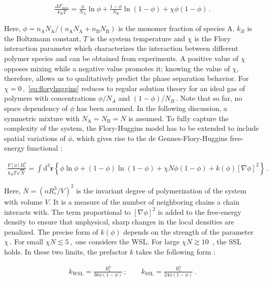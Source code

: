 \documentclass[bachelor,       %
               twoside,        %
               BCOR10mm,       %
               ngerman, english %
               ]{GAUBM}
\begin{document}
\begin{align}
  \frac{\Delta F_{mix}}{k_BT}=\frac{\phi}{N_\mathrm A}\ln\phi+\frac{1-\phi}{N_\mathrm B}\ln(1-\phi)+\chi\phi(1-\phi)\,.
  \label{eq:floryhuggins}
\end{align}

Here, $\phi=n_\mathrm AN_\mathrm A/(n_\mathrm AN_\mathrm A+n_\mathrm BN_\mathrm B)$ is the monomer fraction of species A, $k_B$ is the Boltzmann constant, $T$ is the system temperature and $\chi$ is the Flory interaction parameter which characterizes the interaction between different polymer species and can be obtained from experiments. A positive value of $\chi$ opposes mixing while a negative value promotes it; knowing the value of $\chi$, therefore, allows us to qualitatively predict the phase separation behavior. For $\chi=0\,,$ \eqref{eq:floryhuggins} reduces to regular solution theory for an ideal gas of polymers with concentrations $\phi/N_A$ and $(1-\phi)/N_B\,.$  Note that so far, no space dependency of $\phi$ has been assumed. In the following discussion, a symmetric mixture with $N_\mathrm A=N_\mathrm B=N$ is assumed. To fully capture the complexity of the system, the Flory-Huggins model has to be extended to include spatial variations of $\phi$, which gives rise to the de Gennes-Flory-Huggins free-energy functional  \cite{deGennes80, Reister02}:


\begin{align}
  \frac{F[\phi]R_e^3}{k_BT\sqrt{\bar N}}=\int \mathrm{d}^3\mathbf{r}\left\{\phi\ln\phi+(1-\phi)\ln(1-\phi)+\chi N\phi(1-\phi)+k(\phi)[\nabla\phi]^2\right\}\,.
  \label{eq:flory_fctl}
\end{align}

Here, $\bar N=\left(nR_e^3/V\right)^2$ is the invariant degree of polymerization of the system with volume $V$. It is a measure of the number of neighboring chains a chain interacts with. The term proportional to $[\nabla\phi]^2$ is added to the free-energy density to ensure that unphysical, sharp changes in the local densities are penalized. The precise form of $k(\phi)$ depends on the strength of the parameter $\chi\,$. For small $\chi N\lesssim 5\,,$ one considers the \ac{WSL}. For large $\chi N\gtrsim10\,$ \cite{Semenov1996Dec}, the \ac{SSL} holds. In these two limits, the prefactor $k$ takes the following form \cite{Reister02}:

\begin{align}
  k_\mathrm{WSL}=\frac{R_e^2}{36\phi(1-\phi)}\,;\qquad k_\mathrm{SSL}=\frac{R_e^2}{24\phi(1-\phi)}\,.
\end{align}
\end{document}
